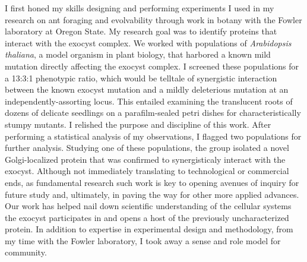 I first honed my skills designing and performing experiments I used in my research on ant foraging and evolvability through work in botany with the Fowler laboratory at Oregon State.
My research goal was to identify proteins that interact with the exocyst complex.
We worked with populations of \textit{Arabidopsis thaliana}, a model organism in plant biology, that harbored a known mild mutation directly affecting the exocyst complex.
I screened these populations for a 13:3:1 phenotypic ratio, which would be telltale of synergistic interaction between the known exocyst mutation and a mildly deleterious mutation at an independently-assorting locus.
This entailed examining the translucent roots of dozens of delicate seedlings on a parafilm-sealed petri dishes for characteristically stumpy mutants.
I relished the purpose and discipline of this work.
After performing a statistical analysis of my observations, I flagged two populations for further analysis.
Studying one of these populations, the group isolated a novel Golgi-localized protein that was confirmed to synergisticaly interact with the exocyst.
Although not immediately translating to technological or commercial ends, as fundamental research such work is key to opening avenues of inquiry for future study and, ultimately, in paving the way for other more applied advances.
Our work has helped nail down scientific understanding of the cellular systems the exocyst participates in and opens a host of the previously uncharacterized protein.
In addition to expertise in experimental design and methodology, from my time with the Fowler laboratory, I took away a sense and role model for community.
